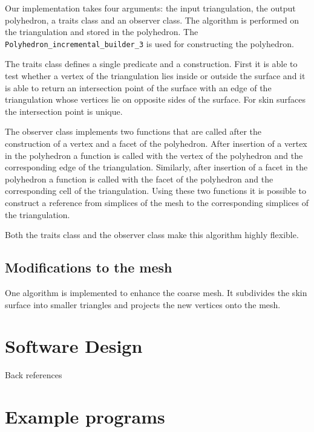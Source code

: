 Our implementation takes four arguments: the input triangulation, the
output polyhedron, a traits class and an observer class.  The
algorithm is performed on the triangulation and stored in the
polyhedron. The \verb~Polyhedron_incremental_builder_3~ is used for
constructing the polyhedron.

The traits class defines a single predicate and a construction. First
it is able to test whether a vertex of the triangulation lies inside
or outside the surface and it is able to return an intersection point
of the surface with an edge of the triangulation whose vertices lie on
opposite sides of the surface. For skin surfaces the intersection
point is unique.

The observer class implements two functions that are called after the
construction of a vertex and a facet of the polyhedron. After
insertion of a vertex in the polyhedron a function is called with the
vertex of the polyhedron and the corresponding edge of the
triangulation. Similarly, after insertion of a facet in the polyhedron
a function is called with the facet of the polyhedron and the
corresponding cell of the triangulation. Using these two functions it
is possible to construct a reference from simplices of the mesh to the
corresponding simplices of the triangulation.

Both the traits class and the observer class make this algorithm highly
flexible.
\subsection{Modifications to the mesh}
One algorithm is implemented to enhance the coarse mesh. It subdivides
the skin surface into smaller triangles and projects the new vertices
onto the mesh.
\section{Software Design}
Back references
\section{Example programs}


